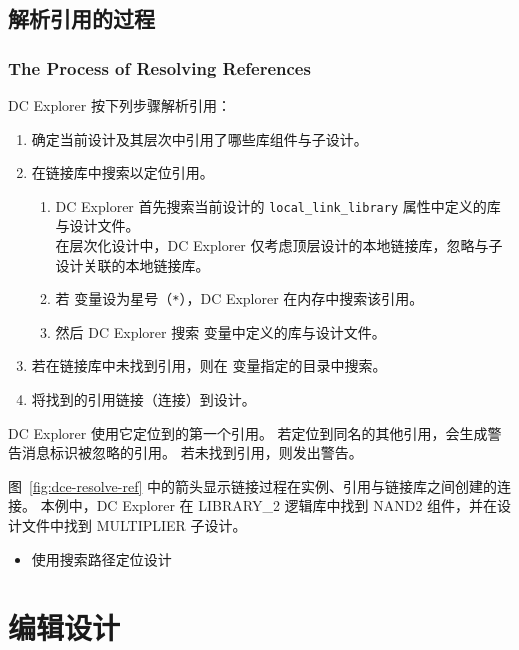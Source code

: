 \subsection{解析引用的过程}
\subsubsection*{The Process of Resolving References}

DC Explorer 按下列步骤解析引用：
\begin{enumerate}
  \item 确定当前设计及其层次中引用了哪些库组件与子设计。
  \item 在链接库中搜索以定位引用。
  \begin{enumerate}
    \item DC Explorer 首先搜索当前设计的 \texttt{local\_link\_library} 属性中定义的库与设计文件。\\
          在层次化设计中，DC Explorer 仅考虑顶层设计的本地链接库，忽略与子设计关联的本地链接库。
    \item 若  变量设为星号（\texttt{*}），DC Explorer 在内存中搜索该引用。
    \item 然后 DC Explorer 搜索  变量中定义的库与设计文件。
  \end{enumerate}
  \item 若在链接库中未找到引用，则在  变量指定的目录中搜索。
  \item 将找到的引用链接（连接）到设计。
\end{enumerate}

DC Explorer 使用它定位到的第一个引用。
若定位到同名的其他引用，会生成警告消息标识被忽略的引用。
若未找到引用，则发出警告。

图~\ref{fig:dce-resolve-ref} 中的箭头显示链接过程在实例、引用与链接库之间创建的连接。
本例中，DC Explorer 在 LIBRARY\_2 逻辑库中找到 NAND2 组件，并在设计文件中找到 MULTIPLIER 子设计。


\begin{seeAlsoBox}
\begin{itemize}
  \item 使用搜索路径定位设计
\end{itemize}
\end{seeAlsoBox}

\section{编辑设计}
